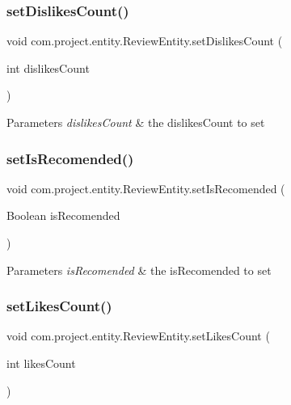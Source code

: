 \subsubsection{set\+Dislikes\+Count()}
{\footnotesize\ttfamily void com.\+project.\+entity.\+Review\+Entity.\+set\+Dislikes\+Count (\begin{DoxyParamCaption}\item[{int}]{dislikes\+Count }\end{DoxyParamCaption})}


\begin{DoxyParams}{Parameters}
{\em dislikes\+Count} & the dislikes\+Count to set \\
\hline
\end{DoxyParams}
\mbox{\label{classcom_1_1project_1_1entity_1_1_review_entity_aee2eace49f40dcad589458cfe376ee16}} 
\subsubsection{set\+Is\+Recomended()}
{\footnotesize\ttfamily void com.\+project.\+entity.\+Review\+Entity.\+set\+Is\+Recomended (\begin{DoxyParamCaption}\item[{Boolean}]{is\+Recomended }\end{DoxyParamCaption})}


\begin{DoxyParams}{Parameters}
{\em is\+Recomended} & the is\+Recomended to set \\
\hline
\end{DoxyParams}
\mbox{\label{classcom_1_1project_1_1entity_1_1_review_entity_abebc1f5fa86f59161240fdb489a27211}} 
\subsubsection{set\+Likes\+Count()}
{\footnotesize\ttfamily void com.\+project.\+entity.\+Review\+Entity.\+set\+Likes\+Count (\begin{DoxyParamCaption}\item[{int}]{likes\+Count }\end{DoxyParamCaption})}


